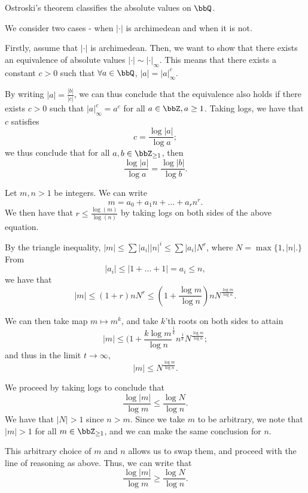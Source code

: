 \documentclass[a4paper, 12pt,oneside,openany]{book}
\begin{document}

Ostroski's theorem classifies the absolute values on $\bbQ$.


 We consider two cases - when $|\cdot|$ is archimedean and when it is not.

 Firstly, assume that $|\cdot|$ is archimedean. Then, we want to show that there exists an equivalence of absolute values $|\cdot| \sim |\cdot|_\infty$. This means that there exists a constant $c>0$ such that $\forall a\in\bbQ$, $|a| = |a|_\infty^c$.

By writing $|a|=\frac{|b|}{|c|}$, we can thus conclude that the equivalence also holds if there exists $c>0$ such that $|a|^c_\infty = a^c$ for all $a\in\bbZ, a\geq1$. Taking logs, we have that $c$ satisfies $$c = \frac{\log|a|}{\log a};$$ we thus conclude that for all $a, b \in \bbZ_{\geq1}$, then $$\frac{\log|a|}{\log a}=\frac{\log|b|}{\log b}.$$

Let $m, n>1$ be integers. We can write $$m=a_0+a_1n+\dots+a_rn^r.$$ We then have that $r \leq \frac{\log(m)}{\log(n)}$ by taking logs on both sides of the above equation.

By the triangle inequality, $|m| \leq \sum|a_i||n|^i \leq \sum |a_i|N^r$, where $N=\max\{1, |n|.\}$ From $$|a_i| \leq |1+\dots+1| = a_i \leq n,$$ we have that $$|m| \leq (1+r)nN^r \leq \left(1+\frac{\log m}{\log n}\right)  nN^{\frac{\log m}{\log n}}.$$

We can then take map $m \mapsto m^k$, and take $k$'th roots on both sides to attain $$|m| \leq (1+\frac{k \log m}{\log n}^{\frac{1}{k}} n^{\frac{1}{k}} N^{\frac{\log m}{\log n}};$$ and thus in the limit $t\to\infty$, $$|m| \leq N^{\frac{\log m}{\log n}}.$$

We proceed by taking logs to conclude that $$\frac{\log|m|}{\log m}\leq\frac{\log N}{\log n}.$$ We have that $|N|>1$ since $n>m$. Since we take $m$ to be arbitrary, we note that $|m|>1$ for all $m \in \bbZ_{\geq 1}$, and we can make the same conclusion for $n$.

This arbitrary choice of $m$ and $n$ allows us to swap them, and proceed with the line of reasoning as above. Thus, we can write that $$\frac{\log|m|}{\log m}\geq\frac{\log N}{\log n}.$$
\end{document}
